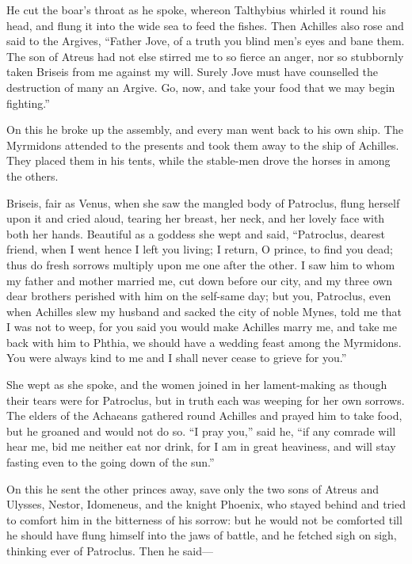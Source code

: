 He cut the boar’s throat as he spoke, whereon Talthybius whirled it round
his head, and flung it into the wide sea to feed the fishes. Then Achilles
also rose and said to the Argives, “Father Jove, of a truth you blind
men’s eyes and bane them. The son of Atreus had not else stirred me to so
fierce an anger, nor so stubbornly taken Briseis from me against my will.
Surely Jove must have counselled the destruction of many an Argive. Go,
now, and take your food that we may begin fighting.”

On this he broke up the assembly, and every man went back to his own ship.
The Myrmidons attended to the presents and took them away to the ship of
Achilles. They placed them in his tents, while the stable-men drove the
horses in among the others.

Briseis, fair as Venus, when she saw the mangled body of Patroclus, flung
herself upon it and cried aloud, tearing her breast, her neck, and her
lovely face with both her hands. Beautiful as a goddess she wept and said,
“Patroclus, dearest friend, when I went hence I left you living; I return,
O prince, to find you dead; thus do fresh sorrows multiply upon me one
after the other. I saw him to whom my father and mother married me, cut
down before our city, and my three own dear brothers perished with him on
the self-same day; but you, Patroclus, even when Achilles slew my husband
and sacked the city of noble Mynes, told me that I was not to weep, for
you said you would make Achilles marry me, and take me back with him to
Phthia, we should have a wedding feast among the Myrmidons. You were
always kind to me and I shall never cease to grieve for you.”

She wept as she spoke, and the women joined in her lament-making as though
their tears were for Patroclus, but in truth each was weeping for her own
sorrows. The elders of the Achaeans gathered round Achilles and prayed him
to take food, but he groaned and would not do so. “I pray you,” said he,
“if any comrade will hear me, bid me neither eat nor drink, for I am in
great heaviness, and will stay fasting even to the going down of the sun.”

On this he sent the other princes away, save only the two sons of Atreus
and Ulysses, Nestor, Idomeneus, and the knight Phoenix, who stayed behind
and tried to comfort him in the bitterness of his sorrow: but he would not
be comforted till he should have flung himself into the jaws of battle,
and he fetched sigh on sigh, thinking ever of Patroclus. Then he said—

